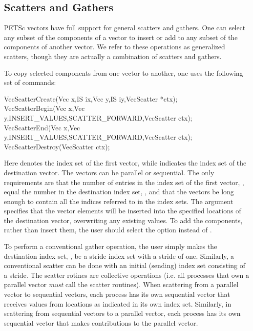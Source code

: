 \subsection{Scatters and Gathers}  
\label{sec_scatter}

PETSc vectors have full support for general scatters and 
gathers. One can select any subset of the components of a vector to
insert or add to any subset of the components of another vector.
We refer to these operations as generalized scatters, though they are 
actually a combination of scatters and gathers. 

 
 
 
To copy selected components from one vector 
to another, one uses the following set of commands:
\begin{tabbing}
  VecScatterCreate(Vec x,IS ix,Vec y,IS iy,VecScatter *ctx);\\
  VecScatterBegin(Vec x,Vec y,INSERT\_VALUES,SCATTER\_FORWARD,VecScatter ctx);\\
  VecScatterEnd(Vec x,Vec y,INSERT\_VALUES,SCATTER\_FORWARD,VecScatter ctx);\\
  VecScatterDestroy(VecScatter ctx);
\end{tabbing} 
Here  denotes the index set of the first vector, while  indicates the index set of the destination vector.  The vectors
can be parallel or sequential. The only requirements are that the
number of entries in the index set of the first vector, ,
equal the number in the destination index set, , and that the
vectors be long enough to contain all the indices referred to in the
index sets.  The argument  specifies that the
vector elements will be inserted into the specified locations of the
destination vector, overwriting any existing values.  To add the
components, rather than insert them, the user should select the option
  instead of .

To perform a conventional gather operation, the user simply makes
 the destination index set, 
, be a stride index set with a stride of one.  Similarly, a 
conventional scatter can be done with an initial (sending) index set 
consisting of a stride.  The scatter rotines are collective operations
(i.e. all processes that own 
a parallel vector {\em must} call the scatter routines). When scattering from a 
parallel vector to sequential vectors, each process has its own sequential 
vector that receives values from locations as indicated in its own 
index set. Similarly, in scattering
from sequential vectors to a parallel vector, each process has its
own sequential vector that makes contributions to the parallel vector.

